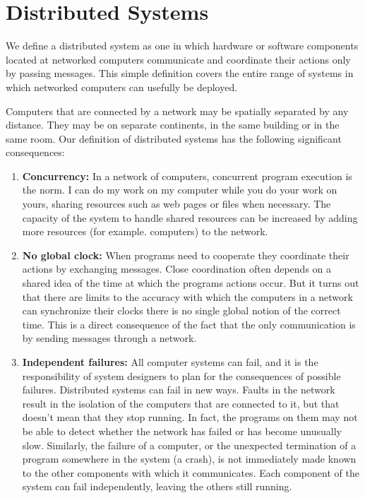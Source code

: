 \section{Distributed Systems}
\noindent

We define a distributed system as one in which hardware or software components
located at networked computers communicate and coordinate their actions only by
passing messages. This simple definition covers the entire range of systems in
which networked computers can usefully be deployed.

Computers that are connected by a network may be spatially separated by any
distance. They may be on separate continents, in the same building or in the
same room. Our definition of distributed systems has the following significant
consequences:


\begin{enumerate}

\item \textbf{Concurrency:}
In a network of computers, concurrent program execution is the norm. I can
do my work on my computer while you do your work on yours, sharing resources
such as web pages or files when necessary. The capacity of the system to handle
shared resources can be increased by adding more resources (for example.
computers) to the network.

\item \textbf{No global clock:}
When programs need to cooperate they coordinate their actions
by exchanging messages. Close coordination often depends on a shared idea of
the time at which the programs actions occur. But it turns out that there are
limits to the accuracy with which the computers in a network can synchronize
their clocks there is no single global notion of the correct time. This is a
direct consequence of the fact that the only communication is by sending
messages through a network.

\item \textbf{Independent failures:}
All computer systems can fail, and it is the
responsibility of system designers to plan for the consequences of possible
failures. Distributed systems can fail in new ways. Faults in the network
result in the isolation of the computers that are connected to it, but that
doesn't mean that they stop running. In fact, the programs on them may not be
able to detect whether the network has failed or has become unusually slow.
Similarly, the failure of a computer, or the unexpected termination of a
program somewhere in the system (a crash), is not immediately made known to the
other components with which it communicates. Each component of the system can
fail independently, leaving the others still running.

\end{enumerate}


